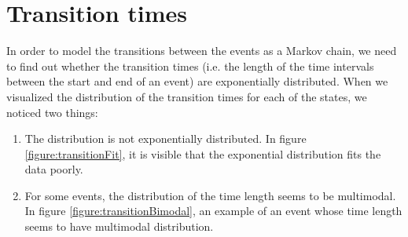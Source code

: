 \documentclass[a4paper]{thesis}
\theoremstyle{definition}
\begin{document}
	\section{Transition times}
	In order to model the transitions between the events as a Markov chain, we need to find out whether the transition times (i.e. the length of the time intervals between the start and end of an event) are exponentially distributed.
	When we visualized the distribution of the transition times for each of the states, we noticed two things:
	\begin{enumerate}
		\item The distribution is not exponentially distributed.
		In figure \ref{figure:transitionFit}, it is visible that the exponential distribution fits the data poorly.
		\item For some events, the distribution of the time length seems to be multimodal.
		In figure \ref{figure:transitionBimodal}, an example of an event whose time length seems to have multimodal distribution.
	\end{enumerate}
\end{document}
